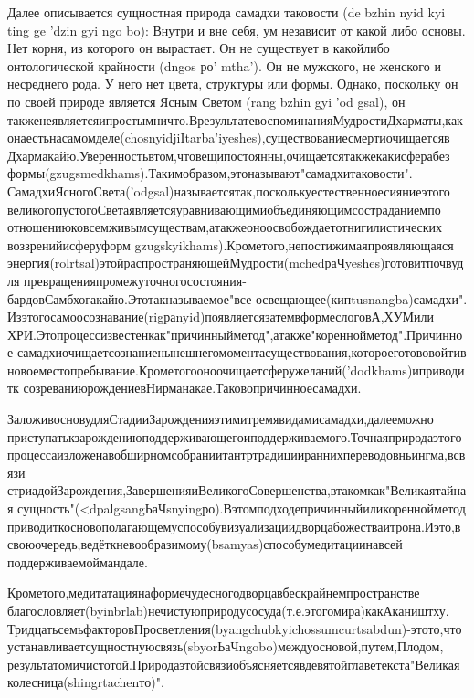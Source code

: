 Далее описывается сущностная природа самадхи таковости (de bzhin nyid kyi ting ge 'dzin
gyi ngo bo): Внутри и вне себя, ум независит от какой либо основы. Нет корня, из которого
он вырастает. Он не существует в какойлибо онтологической крайности (dngos ро' mtha'). Он
не мужского, не женского и несреднего рода. У него нет цвета, структуры или формы.
Однако, поскольку он по своей природе является Ясным Светом (rang bzhin gyi 'od gsal), он
такженеявляетсяипростымничто.ВрезультатевоспоминанияМудростиДхарматы,как
онаестьнасамомделе(chosnyidjiItarba'iyeshes),существованиесмертиочищаетсяв
Дхармакайю.Уверенностьвтом,чтовещипостоянны,очищаетсятакжекакисферабез
формы(gzugsmedkhams).Такимобразом,этоназывают"самадхитаковости".
СамадхиЯсногоСвета('odgsal)называетсятак,посколькуестественноесияниеэтого
великогопустогоСветаявляетсяуравнивающимиобъединяющимсостраданиемпо
отношениюковсемживымсуществам,атакжеоноосвобождаетотнигилистических
воззренийисферуформ gzugskyikhams).Крометого,непостижимаяпроявляющаяся
энергия(rolrtsal)этойраспространяющейМудрости(mchedраЧyeshes)готовитпочвудля
превращенияпромежуточногосостояния-бардовСамбхогакайю.Этотакназываемое"все
освещающее(кипtusnangba)самадхи".
Изэтогосамоосознавание(rigраnyid)появляетсязатемвформеслоговА,ХУМили
ХРИ.Этопроцессизвестенкак"причинныйметод",атакже"кореннойметод".Причинное
самадхиочищаетсознаниенынешнегомоментасуществования,котороеготововойтив
новоеместопребывание.Крометогооноочищаетсферужеланий('dodkhams)иприводитк
созреваниюрождениевНирманакае.Таковопричинноесамадхи.


ЗаложивосновудляСтадииЗарожденияэтимитремявидамисамадхи,далееможно
приступатькзарождениюподдерживающегоиподдерживаемого.Точнаяприродаэтого
процессаизложенавобширномсобраниитантртрадициираннихпереводовньингма,всвязи
стриадойЗарождения,ЗавершенияиВеликогоСовершенства,втакомкак"Великаятайная
сущность"(<dpalgsangЬаЧsnyingро).Вэтомподходепричинныйиликореннойметод
приводиткосновополагающемуспособувизуализациидворцабожестваитрона.Иэто,в
своюочередь,ведёткневообразимому(bsamyas)способумедитациинавсей
поддерживаемоймандале.

Крометого,медитатациянаформечудесногодворцавбескрайнемпространстве
благословляет(byinbrlab)нечистуюприродусосуда(т.е.этогомира)какАкаништху.
ТридцатьсемьфакторовПросветления(byangchubkyichossumcurtsabdun)-этото,что
устанавливаетсущностнуюсвязь(sbyorЬаЧngobo)междуосновой,путем,Плодом,
результатомичистотой.Природаэтойсвязиобъясняетсявдевятойглаветекста"Великая
колесница(shingrtachenто)".

